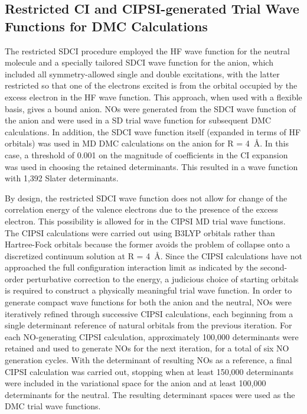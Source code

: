 \subsection{Restricted CI and CIPSI-generated Trial Wave Functions for DMC Calculations}
\label{subsec:rSDCI}
The restricted SDCI procedure employed the HF wave function for the neutral molecule and a specially tailored SDCI wave function for the anion, which included all symmetry-allowed single and double excitations, with the latter restricted so that one of the electrons excited is from the orbital occupied by the excess electron in the HF wave function.
This approach, when used with a flexible basis, gives a bound anion.
NOs were generated from the SDCI wave function of the anion and were used in a SD trial wave function for subsequent DMC calculations.
In addition, the SDCI wave function itself (expanded in terms of HF orbitals) was used in MD DMC calculations on the anion for R = \SI{4}{\angstrom}. 
In this case, a threshold of 0.001 on the magnitude of coefficients in the CI expansion was used in choosing the retained determinants.
This resulted in a wave function with 1,392 Slater determinants.

By design, the restricted SDCI wave function does not allow for change of the correlation energy of the valence electrons due to the presence of the excess electron.
This possibility is allowed for in the CIPSI MD trial wave functions.
The CIPSI calculations were carried out using B3LYP orbitals rather than Hartree-Fock orbitals because the former avoids the problem of collapse onto a discretized continuum solution at R =  \SI{4}{\angstrom}.\cite{10.1103/PhysRevA.38.3098,10.1103/PhysRevB.37.785,10.1139/p80-159}
Since the CIPSI calculations have not approached the full configuration interaction limit as indicated by the second-order perturbative correction to the energy, a judicious choice of starting orbitals is required to construct a physically meaningful trial wave function.
In order to generate compact wave functions for both the anion and the neutral, NOs were iteratively refined through successive CIPSI calculations, each beginning from a single determinant reference of natural orbitals from the previous iteration.
For each NO-generating CIPSI calculation, approximately 100,000 determinants were retained and used to generate NOs for the next iteration, for a total of six NO generation cycles. 
With the determinant of resulting NOs as a reference, a final CIPSI calculation was carried out, stopping when at least 150,000 determinants were included in the variational space for the anion and at least 100,000 determinants for the neutral. 
The resulting determinant spaces were used as the DMC trial wave functions.

